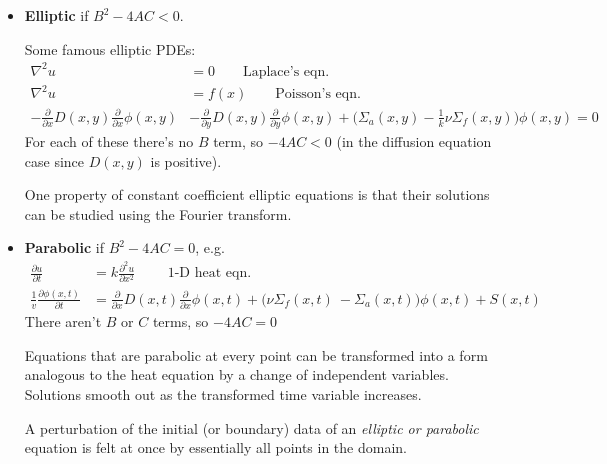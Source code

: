 \documentclass[12pt]{article}
\newcommand{\Macro}{\ensuremath{\Sigma}}
\begin{document}
\begin{itemize}
\item \textbf{Elliptic} if $B^2 - 4 AC < 0$. %

Some famous elliptic PDEs:
\begin{align*}
\nabla^2 u &= 0 \qquad \text{Laplace's eqn.} \nonumber \\
\nabla^2 u &= f(x) \qquad \text{Poisson's eqn.} \nonumber \\
-\frac{\partial}{\partial x}D(x,y)\frac{\partial}{\partial x}\phi(x,y) &- \frac{\partial}{\partial y}D(x,y)\frac{\partial}{\partial y}\phi(x,y) + \bigl(\Macro_a(x,y) - \frac{1}{k} \nu \Macro_f(x,y)\bigr) \phi(x,y) = 0\nonumber
\end{align*}
For each of these there's no $B$ term, so $-4AC < 0$ (in the diffusion equation case since $D(x,y)$ is positive).

One property of constant coefficient elliptic equations is that their solutions can be studied using the Fourier transform. %

\item \textbf{Parabolic} if $B^2 - 4 AC = 0$, e.g.
\begin{align}
\frac{\partial u}{\partial t} &= k \frac{\partial^2 u}{\partial x^2} \qquad \text{ 1-D heat eqn.} \nonumber \\
\frac{1}{v}\frac{\partial \phi(x,t)}{\partial t} &= \frac{\partial}{\partial x}D(x,t)\frac{\partial}{\partial x}\phi(x,t) + \bigl(\nu \Macro_f(x,t)\ - \Macro_a(x,t)\bigr) \phi(x,t) + S(x,t)\nonumber
\end{align}
There aren't $B$ or $C$ terms, so $-4AC = 0$

Equations that are parabolic at every point can be transformed into a form analogous to the heat equation by a change of independent variables. Solutions smooth out as the transformed time variable increases.

A perturbation of the initial (or boundary) data of an \textit{elliptic or parabolic} equation is felt at once by essentially all points in the domain. 


\end{itemize}
\end{document}
